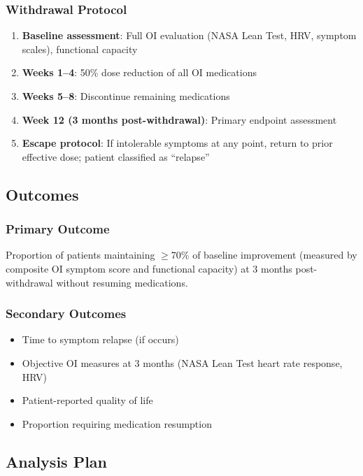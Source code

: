 \subsubsection{Withdrawal Protocol}
\begin{enumerate}
    \item \textbf{Baseline assessment}: Full OI evaluation (NASA Lean Test, HRV, symptom scales), functional capacity
    \item \textbf{Weeks 1--4}: 50\% dose reduction of all OI medications
    \item \textbf{Weeks 5--8}: Discontinue remaining medications
    \item \textbf{Week 12 (3 months post-withdrawal)}: Primary endpoint assessment
    \item \textbf{Escape protocol}: If intolerable symptoms at any point, return to prior effective dose; patient classified as ``relapse''
\end{enumerate}

\subsection{Outcomes}

\subsubsection{Primary Outcome}
Proportion of patients maintaining $\geq$70\% of baseline improvement (measured by composite OI symptom score and functional capacity) at 3 months post-withdrawal without resuming medications.

\subsubsection{Secondary Outcomes}
\begin{itemize}
    \item Time to symptom relapse (if occurs)
    \item Objective OI measures at 3 months (NASA Lean Test heart rate response, HRV)
    \item Patient-reported quality of life
    \item Proportion requiring medication resumption
\end{itemize}

\subsection{Analysis Plan}

